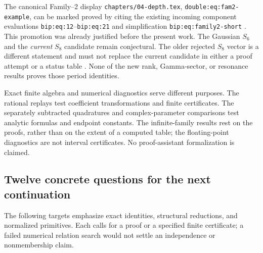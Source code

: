 \documentclass[11pt,letterpaper]{article}
\numberwithin{equation}{section}
\theoremstyle{plain}
\theoremstyle{definition}
\theoremstyle{remark}
\begin{document}
The canonical Family--2 display
\texttt{chapters/04-depth.tex}, \texttt{double:eq:fam2-example},
can be marked proved by citing the existing incoming component
evaluations \texttt{bip:eq:12}--\texttt{bip:eq:21} and simplification
\texttt{bip:eq:family2-short} \cite{PTI}. This promotion was already
justified before the present work. The Gaussian $S_6$ and the
\emph{current} $S_8$ candidate remain conjectural. The older rejected
$S_8$ vector is a different statement and must not replace the current
candidate in either a proof attempt or a status table \cite{Repo,PTI}.
None of the new rank, Gamma-sector, or resonance results proves those
period identities.

Exact finite algebra and numerical diagnostics serve different
purposes. The rational replays test coefficient transformations and
finite certificates. The separately subtracted quadratures and
complex-parameter comparisons test analytic formulas and endpoint
constants. The infinite-family results rest on the proofs, rather than
on the extent of a computed table; the floating-point diagnostics are
not interval certificates. No proof-assistant formalization is claimed.

\subsection{Twelve concrete questions for the next continuation}
\label{audit:future}

The following targets emphasize exact identities, structural reductions,
and normalized primitives. Each calls for a proof or a specified finite
certificate; a failed numerical relation search would not settle an
independence or nonmembership claim.
\end{document}
